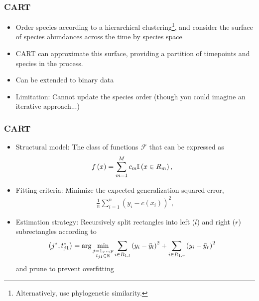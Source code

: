\documentclass{beamer}
\begin{document}
\begin{frame}
  \frametitle{CART}
  \begin{itemize}
  \item Order species according to a hierarchical
    clustering\footnote{Alternatively, use phylogenetic similarity.}, and
    consider the surface of species abundances across the time by species space
  \item CART can approximate this surface, providing a partition of timepoints
    and species in the process.
  \item Can be extended to binary data
  \item Limitation: Cannot update the species order (though you could imagine an
    iterative approach...)
  \end{itemize}
\end{frame}

\begin{frame}
  \frametitle{CART}
\begin{itemize}
\item Structural model: The class of functions $\mathcal{F}$ that can be
  expressed as
\begin{align*}
  f\left(x\right) &= \sum_{m = 1}^{M} c_{m} \mathbb{I}\left({x \in R_{m}}\right),
\end{align*}
\item Fitting criteria: Minimize the expected generalization squared-error,
\begin{align*}
  \frac{1}{n} \sum_{i = 1}^{n} \left(y_{i} - c\left(x_{i}\right)\right)^{2},
\end{align*}
\item Estimation strategy: Recursively split rectangles into left ($l$) and
  right ($r$) subrectangles according to
\begin{align*}
  \left(j^{\ast}, t_{j1}^{\ast}\right) &= \arg \min_{\substack{j = 1, \dots, p \\ t_{j1} \in \mathbb{R}}} \sum_{i \in R_{1, l}} \left(y_{i} - \bar{y}_{l}\right)^{2} + \sum_{i \in R_{1, r}} \left(y_{i} - \bar{y}_{r}\right)^{2}
\end{align*}
and prune to prevent overfitting
\end{itemize}
\end{frame}
\end{document}
